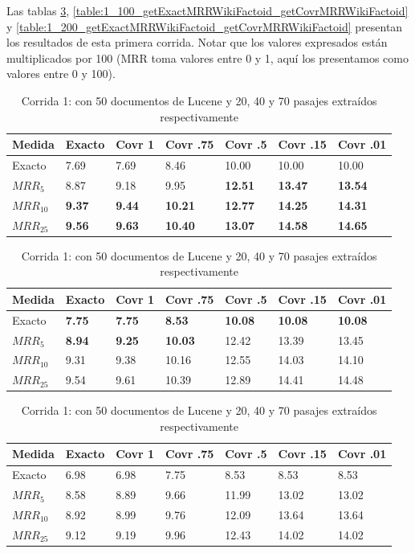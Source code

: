 Las tablas \ref{table:1_50_getExactMRRWikiFactoid_getCovrMRRWikiFactoid}, \ref{table:1_100_getExactMRRWikiFactoid_getCovrMRRWikiFactoid} y \ref{table:1_200_getExactMRRWikiFactoid_getCovrMRRWikiFactoid} presentan los resultados de esta primera corrida. Notar que los valores expresados están multiplicados por 100 (MRR toma valores entre 0 y 1, aquí los presentamos como valores entre 0 y 100).

\begin{table}
\centering
\begin{center}
\begin{tabular}{|l | l | l | l | l | l | l |}
\hline
Medida & Exacto & Covr 1 & Covr .75 & Covr .5 & Covr .15 & Covr .01 \\ \hline
Exacto & 7.69 & 7.69 & 8.46 & 10.00 & 10.00 & 10.00  \\ \hline
$MRR_{5}$ & 8.87 & 9.18 & 9.95 & \textbf{12.51} & \textbf{13.47} & \textbf{13.54}  \\ \hline
$MRR_{10}$ & \textbf{9.37} & \textbf{9.44} & \textbf{10.21} & \textbf{12.77} & \textbf{14.25} & \textbf{14.31}  \\ \hline
$MRR_{25}$ & \textbf{9.56} & \textbf{9.63} & \textbf{10.40} & \textbf{13.07} & \textbf{14.58} & \textbf{14.65}  \\ \hline
\end{tabular}

\medskip

\begin{tabular}{|l | l | l | l | l | l | l |}
\hline
Medida & Exacto & Covr 1 & Covr .75 & Covr .5 & Covr .15 & Covr .01 \\ \hline
Exacto & \textbf{7.75} & \textbf{7.75} & \textbf{8.53} & \textbf{10.08} & \textbf{10.08} & \textbf{10.08}  \\ \hline
$MRR_{5}$ & \textbf{8.94} & \textbf{9.25} & \textbf{10.03} & 12.42 & 13.39 & 13.45  \\ \hline
$MRR_{10}$ & 9.31 & 9.38 & 10.16 & 12.55 & 14.03 & 14.10  \\ \hline
$MRR_{25}$ & 9.54 & 9.61 & 10.39 & 12.89 & 14.41 & 14.48  \\ \hline
\end{tabular}

\medskip

\begin{tabular}{|l | l | l | l | l | l | l |}
\hline
Medida & Exacto & Covr 1 & Covr .75 & Covr .5 & Covr .15 & Covr .01 \\ \hline
Exacto & 6.98 & 6.98 & 7.75 & 8.53 & 8.53 & 8.53  \\ \hline
$MRR_{5}$ & 8.58 & 8.89 & 9.66 & 11.99 & 13.02 & 13.02  \\ \hline
$MRR_{10}$ & 8.92 & 8.99 & 9.76 & 12.09 & 13.64 & 13.64  \\ \hline
$MRR_{25}$ & 9.12 & 9.19 & 9.96 & 12.43 & 14.02 & 14.02  \\ \hline
\end{tabular}

\caption{Corrida 1: con 50 documentos de Lucene y 20, 40 y 70 pasajes extraídos respectivamente}
\label{table:1_50_getExactMRRWikiFactoid_getCovrMRRWikiFactoid}
\end{center}
\end{table}


